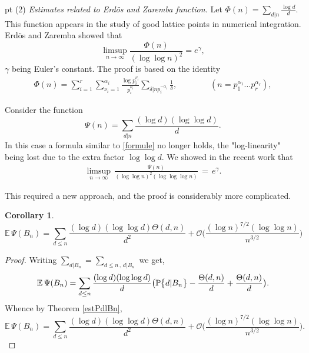 \documentclass[11pt,draft,reqno]{amsart}
\newtheorem{lemma}[theorem]{Lemma}
\newtheorem{corollary}[theorem]{Corollary}
\theoremstyle{definition}
\theoremstyle{remarks}
\numberwithin{equation}{section}
\def \a{{\alpha}}
\def \d{{\delta}}
\def \g{{\gamma}}
\def \noi{{\noindent}}
\def \qq{{\qquad}}
\def\P{{\mathcal P}}
\def\E{{\mathbb E \,}}
\def\P{{\mathbb P}}
\begin{document}
   
  pt \noi (2) {\it Estimates related to Erd\"os and  Zaremba function.}
Let $\Phi(n)=\sum_{d|n} \frac{\log d}{d}$.  This function appears in the study of good lattice points in numerical integration. Erd\"os and  Zaremba  \cite{EZ} showed that
$$ \limsup_{n\to \infty} \frac{\Phi(n)}{(\log\log n)^2}=e^\g,$$ $\g$ being Euler's constant. The proof
   is based on the identity
 \begin{eqnarray}\label{formule}\Phi(n)
=\sum_{i=1}^r \sum_{\nu_i=1}^{\a_i}\frac{\log p_i^{\nu_i}}{p_i^{\nu_i}}\sum_{\d|n p_i^{-\a_i}}\frac{1}{\d} , \qq\qq ( n= p_1^{\a_1}\ldots p_r^{\a_r}),
\end {eqnarray}

 Consider  the function 
 $$\Psi(n)= \sum_{d|n} \frac{(\log d )(\log\log d)}{d} .$$  In this case  a  formula similar to \eqref{formule}   no longer holds, the "log-linearity" being  lost due to the extra factor $\log\log d$. 
We showed in the recent work  \cite{W11}
that
  \begin{eqnarray*}  \limsup_{n\to \infty}\, \frac{\Psi(n)}{(\log \log n)^2(\log\log\log n)}\,=\, e^\g.\end{eqnarray*}
  
This required  a new approach, and the proof is considerably more complicated. 
  \begin{corollary}
 $$  \E \Psi(B_n)= \sum_{d\le n} \frac{(\log d )(\log\log d)\Theta(d,n)}{d^2} + {\mathcal O}\Big(\frac{(\log n)^{7/2}(\log\log n)}{n^{ 3/2}}
   \Big)$$
  \end{corollary}
  \begin{proof}Writing $\sum_{d| B_n} =\sum_{d\le n\,,\,d|B_n}$ we get,
$$\E \Psi(B_n)=\sum_{d\le n}  \frac{(\log d )(\log\log d)}{d}\big(\P\big\{d|B_n\big\}-{\Theta(d,n)\over d} +{\Theta(d,n)\over d}\big).$$
 Whence by Theorem \ref{estPdlBn},$$  \E \Psi(B_n)= \sum_{d\le n} \frac{(\log d )(\log\log d)\Theta(d,n)}{d^2} + {\mathcal O}\Big(\frac{(\log n)^{7/2}(\log\log n)}{n^{ 3/2}}
 \Big)
  . $$
 
\end{proof}

 
\end{document}

